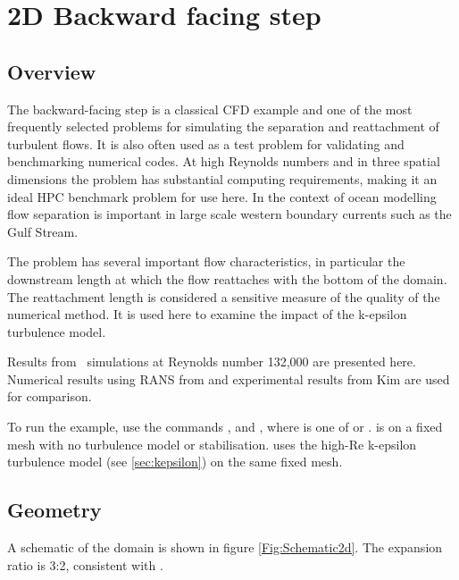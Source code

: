 
\section{2D Backward facing step}
\label{sec:backward_facing_step_2d}


\subsection{Overview}
The backward-facing step is a classical CFD example and one of the most frequently selected
problems for simulating the separation and reattachment of turbulent flows.
It is also often used as a test problem for validating and benchmarking numerical codes.
At high Reynolds numbers and in three spatial dimensions the problem has substantial
computing requirements, making it an ideal HPC benchmark problem for use here.
In the context of ocean modelling flow separation is important
in large scale western boundary currents such as the Gulf Stream.

The problem has several important flow characteristics,
in particular the downstream length at which the flow reattaches with the bottom of the domain. 
The reattachment length is considered a sensitive measure of the quality of the numerical method.
It is used here to examine the impact of the k-epsilon turbulence model.

Results from \fluidity\ simulations at Reynolds number 132,000
are presented here. Numerical results using RANS from \cite{ilinca_97}
and experimental results from Kim \cite{ilinca_97} are used for comparison.

To run the example, use the commands , 
and , where  is one of  or
.  is on a fixed mesh with no turbulence model
or stabilisation.  uses the high-Re k-epsilon turbulence model (see \ref{sec:kepsilon})
on the same fixed mesh.

\subsection{Geometry}
A schematic of the domain is shown in figure \ref{Fig:Schematic2d}.
The expansion ratio is 3:2, consistent with \cite{ilinca_97}.

